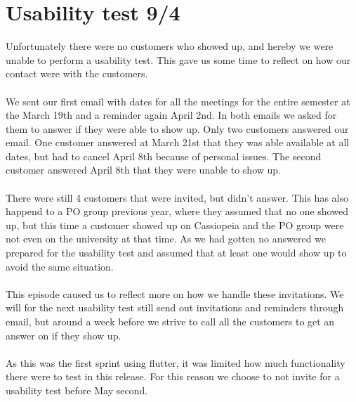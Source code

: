 \section{Usability test 9/4}
Unfortunately there were no customers who showed up, and hereby we were unable to perform a usability test.
This gave us some time to reflect on how our contact were with the customers.
\\\\
We sent our first email with dates for all the meetings for the entire semester at the March 19th and a reminder again April 2nd.
In both emails we asked for them to answer if they were able to show up. 
Only two customers answered our email. 
One customer answered at March 21st that they was able available at all dates, but had to cancel April 8th because of personal issues.
The second customer answered April 8th that they were unable to show up.
\\\\
There were still 4 customers that were invited, but didn't answer.
This has also happend to a PO group previous year, where they assumed that no one showed up, but this time a customer showed up on Cassiopeia and the PO group were not even on the university at that time. 
As we had gotten no answered we prepared for the usability test and assumed that at least one would show up to avoid the same situation.
\\\\
This episode caused us to reflect more on how we handle these invitations.
We will for the next usability test still send out invitations and reminders through email, but around a week before we strive to call all the customers to get an answer on if they show up. 
\\\\
As this was the first sprint using flutter, it was limited how much functionality there were to test in this release. 
For this reason we choose to not invite for a usability test before May second.
